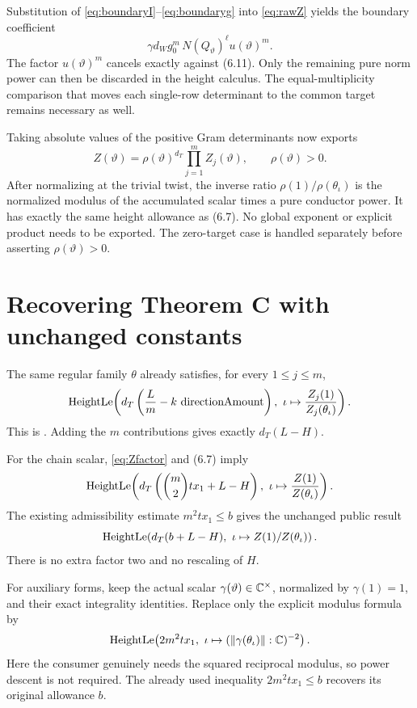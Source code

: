 Substitution of \eqref{eq:boundaryI}--\eqref{eq:boundaryg} into
\eqref{eq:rawZ} yields the boundary coefficient
\[
 \gamma d_W g_0^m\,N(Q_\vartheta)^\ell u(\vartheta)^m.
\]
The factor \(u(\vartheta)^m\) cancels exactly against (6.11).
Only the remaining pure norm power can then be discarded in the height
calculus. The equal-multiplicity comparison that moves each single-row
determinant to the common target remains necessary as well.

Taking absolute values of the positive Gram determinants now exports
\begin{equation}
 Z(\vartheta)=\rho(\vartheta)^{d_T}
       \prod_{j=1}^m Z_j(\vartheta),
 \qquad \rho(\vartheta)>0.
 \label{eq:Zfactor}
\end{equation}
After normalizing at the trivial twist, the inverse ratio
\(\rho(1)/\rho(\theta_\iota)\) is the normalized modulus of the accumulated
scalar times a pure conductor power. It has exactly the same height
allowance as (6.7). No global exponent or explicit
 product needs to be exported.
The zero-target case is handled separately before asserting
\(\rho(\vartheta)>0\).

\section{Recovering Theorem C with unchanged constants}
\label{sec:C}

The same regular family \(\theta\) already satisfies, for every
\(1\le j\le m\),
\begin{equation}
 \operatorname{HeightLe}\!\left(
 d_T\left(\frac{L}{m}-k\,\operatorname{directionAmount}\right),
 \ \iota\mapsto\frac{Z_j(1)}{Z_j(\theta_\iota)}
 \right).
 \label{eq:singleheight}
\end{equation}
This is
.
Adding the \(m\) contributions gives exactly \(d_T(L-H)\).

For the chain scalar, \eqref{eq:Zfactor} and (6.7) imply
\[
 \operatorname{HeightLe}\!\left(
 d_T\left(\binom m2 tx_1+L-H\right),
 \ \iota\mapsto \frac{Z(1)}{Z(\theta_\iota)}
 \right).
\]
The existing admissibility estimate \(m^2tx_1\le b\) gives the unchanged
public result
\begin{equation}
 \operatorname{HeightLe}\!\left(d_T(b+L-H),
 \ \iota\mapsto Z(1)/Z(\theta_\iota)\right).
 \label{eq:oldbound}
\end{equation}
There is no extra factor two and no rescaling of \(H\).

For auxiliary forms, keep the actual scalar
\(\gamma(\vartheta)\in\mathbb C^\times\), normalized by \(\gamma(1)=1\),
and their exact integrality identities. Replace only the explicit
 modulus formula by
\begin{equation}
 \HLe\!\left(
 2m^2tx_1,\ 
 \iota\mapsto(\norm{\gamma(\theta_\iota)}:\C)^{-2}
 \right).
\end{equation}
Here the consumer genuinely needs the squared reciprocal modulus, so
power descent is not required. The already used inequality
\(2m^2tx_1\le b\) recovers its original allowance \(b\).

